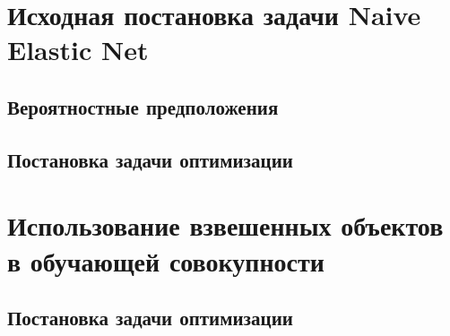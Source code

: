 \documentclass[12pt]{article}
\begin{document}
	\newpage \tableofcontents

	\section{Исходная постановка задачи Naive Elastic Net}
		\subsection{Вероятностные предположения}	
		\subsection{Постановка задачи оптимизации} 	
	\section{Использование взвешенных объектов в обучающей совокупности}
		\subsection{Постановка задачи оптимизации} 	
	
\end{document}
